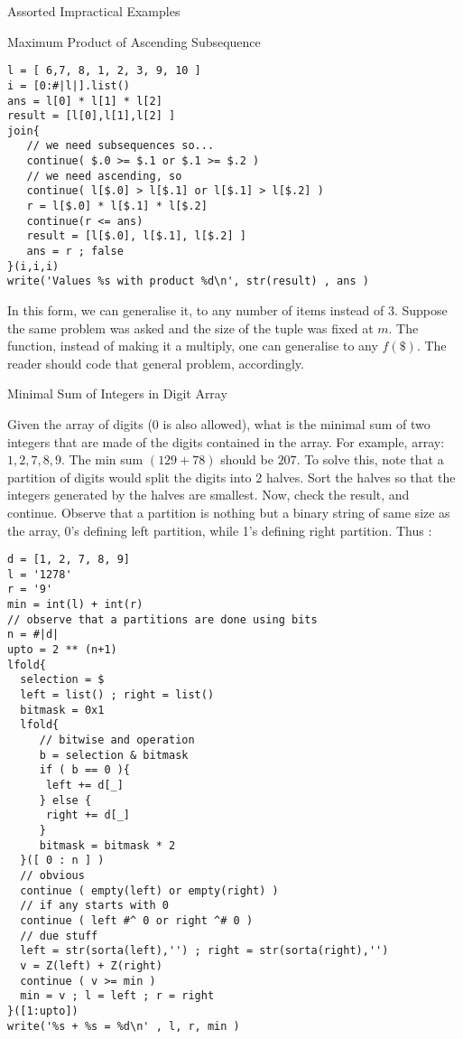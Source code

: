 \begin{section}{Assorted Impractical Examples}
\begin{subsection}{Maximum Product of Ascending Subsequence}
\begin{center}\begin{minipage}{\linewidth}
\begin{lstlisting}[style=JexlStyle]
l = [ 6,7, 8, 1, 2, 3, 9, 10 ]
i = [0:#|l|].list()
ans = l[0] * l[1] * l[2]
result = [l[0],l[1],l[2] ]
join{
   // we need subsequences so...
   continue( $.0 >= $.1 or $.1 >= $.2 )
   // we need ascending, so 
   continue( l[$.0] > l[$.1] or l[$.1] > l[$.2] )
   r = l[$.0] * l[$.1] * l[$.2]
   continue(r <= ans)
   result = [l[$.0], l[$.1], l[$.2] ] 
   ans = r ; false  
}(i,i,i)
write('Values %s with product %d\n', str(result) , ans )
\end{lstlisting}  
\end{minipage}\end{center}

In this form, we can generalise it, to any number of items instead of 3.
Suppose the same problem was asked and the size of the tuple was fixed at $m$.
The function, instead of making it a multiply, one can generalise to any $f(\$)$.
The reader should code that general problem, accordingly.

\end{subsection}

\begin{subsection}{Minimal Sum of Integers in Digit Array}

Given the array of digits (0 is also allowed), what is the minimal sum of two integers 
that are made of the digits contained in the array. 
For example, array: $1, 2, 7, 8, 9$. The min sum $(129 + 78)$ should be $207$.
To solve this, note that a partition of digits would split the digits into 2 halves.
Sort the halves so that the integers generated by the halves are smallest.
Now, check the result, and continue. Observe that a partition 
is nothing but a binary string of same size as the array, 0's defining 
left partition, while 1's defining right partition. Thus :

\begin{center}\begin{minipage}{\linewidth}
\begin{lstlisting}[style=JexlStyle]
d = [1, 2, 7, 8, 9]
l = '1278'
r = '9' 
min = int(l) + int(r)  
// observe that a partitions are done using bits
n = #|d|
upto = 2 ** (n+1) 
lfold{
  selection = $ 
  left = list() ; right = list()
  bitmask = 0x1
  lfold{
     // bitwise and operation 
     b = selection & bitmask 
     if ( b == 0 ){ 
      left += d[_]   
     } else {
      right += d[_]   
     }
     bitmask = bitmask * 2 
  }([ 0 : n ] )
  // obvious 
  continue ( empty(left) or empty(right) ) 
  // if any starts with 0 
  continue ( left #^ 0 or right ^# 0 ) 
  // due stuff 
  left = str(sorta(left),'') ; right = str(sorta(right),'')
  v = Z(left) + Z(right)
  continue ( v >= min )
  min = v ; l = left ; r = right 
}([1:upto])
write('%s + %s = %d\n' , l, r, min )
\end{lstlisting}  
\end{minipage}\end{center}


\end{subsection}
\end{section}
